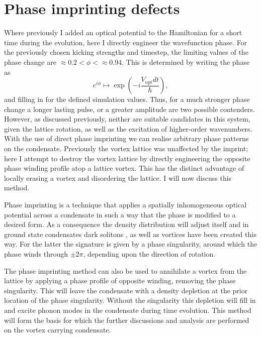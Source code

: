\section{Phase imprinting defects}\label{sec:phase}

Where previously I added an optical potential to the Hamiltonian for a short time during the evolution, here I directly engineer the wavefunction phase. For the previously chosen kicking strengths and timestep, the limiting values of the phase change are $\approx 0.2 < \phi < \approx 0.94$. This is determined by writing the phase as
\begin{equation}
    e^{i\phi} \mapsto \exp\left(-i\frac{V_{\textrm{opt}}dt}{\hbar}\right),
\end{equation}
and filling in for the defined simulation values. Thus, for a much stronger phase change a longer lasting pulse, or a greater amplitude are two possible contenders. However, as discussed previously, neither are suitable candidates in this system, given the lattice rotation, as well as the excitation of higher-order wavenumbers. With the use of direct phase imprinting we can realise arbitrary phase patterns on the condensate. Previously the vortex lattice was unaffected by the imprint; here I attempt to destroy the vortex lattice by directly engineering the opposite phase winding profile atop a lattice vortex. This has the distinct advantage of locally erasing a vortex and disordering the lattice. I will now discuss this method.

Phase imprinting is a technique that applies a spatially inhomogeneous optical potential across a condensate in such a way that the phase is modified to a desired form. As a consequence the density distribution will adjust itself and in ground state condensates dark solitons \cite{BEC:Denschlag_science_2000}, as well as vortices \cite{Vtx:Dobrek_pra_1999} have been created this way. For the latter the signature is given by a phase singularity, around which the phase winds through $\pm 2\pi$, depending upon the direction of rotation.

The phase imprinting method can also be used to annihilate a vortex from the lattice by applying a phase profile of opposite winding, removing the phase singularity.  This will leave the condensate with a density depletion at the prior location of the phase singularity. Without the singularity this depletion will fill in and excite phonon modes in the condensate during time evolution. This method will form the basis for which the further discussions and analysis are performed on the vortex carrying condensate.


